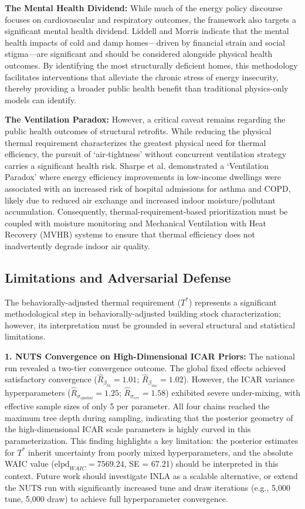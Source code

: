\documentclass[11pt, a4paper, twocolumn, numbers]{elsarticle}
\begin{document}
\textbf{The Mental Health Dividend:} While much of the energy policy discourse focuses on cardiovascular and respiratory outcomes, the framework also targets a significant mental health dividend. Liddell and Morris \cite{Liddell2010} indicate that the mental health impacts of cold and damp homes---driven by financial strain and social stigma---are significant and should be considered alongside physical health outcomes. By identifying the most structurally deficient homes, this methodology facilitates interventions that alleviate the chronic stress of energy insecurity, thereby providing a broader public health benefit than traditional physics-only models can identify.

\textbf{The Ventilation Paradox:} However, a critical caveat remains regarding the public health outcomes of structural retrofits. While reducing the physical thermal requirement characterizes the greatest physical need for thermal efficiency, the pursuit of `air-tightness' without concurrent ventilation strategy carries a significant health risk. Sharpe et al. \cite{Sharpe2019}  demonstrated a `Ventilation Paradox' where energy efficiency improvements in low-income dwellings were associated with an increased risk of hospital admissions for asthma and COPD, likely due to reduced air exchange and increased indoor moisture/pollutant accumulation. Consequently, thermal-requirement-based prioritization must be coupled with moisture monitoring and Mechanical Ventilation with Heat Recovery (MVHR) systems to ensure that thermal efficiency does not inadvertently degrade indoor air quality.


\subsection{Limitations and Adversarial
Defense}\label{limitations-and-adversarial-defense}

The behaviorally-adjusted thermal requirement (\(T^*\)) represents a significant 
methodological step in behaviorally-adjusted building stock 
characterization; however, its interpretation must be grounded in 
several structural and statistical limitations.

\textbf{1. NUTS Convergence on High-Dimensional ICAR Priors:} The national run revealed a two-tier convergence outcome. The global fixed effects achieved satisfactory convergence ($\hat{R}_{\beta_{th}} = 1.01$; $\hat{R}_{\beta_{inc}} = 1.02$). However, the ICAR variance hyperparameters ($\hat{R}_{\sigma_{spatial}} = 1.25$; $\hat{R}_{\sigma_{err}} = 1.58$) exhibited severe under-mixing, with effective sample sizes of only 5 per parameter. All four chains reached the maximum tree depth during sampling, indicating that the posterior geometry of the high-dimensional ICAR scale parameters is highly curved in this parameterization. This finding highlights a key limitation: the posterior estimates for $T^*$ inherit uncertainty from poorly mixed hyperparameters, and the absolute WAIC value ($\text{elpd}_{WAIC} = 7569.24$, SE = 67.21) should be interpreted in this context. Future work should investigate INLA as a scalable alternative, or extend the NUTS run with significantly increased tune and draw iterations (e.g., 5,000 tune, 5,000 draw) to achieve full hyperparameter convergence.
\end{document}
